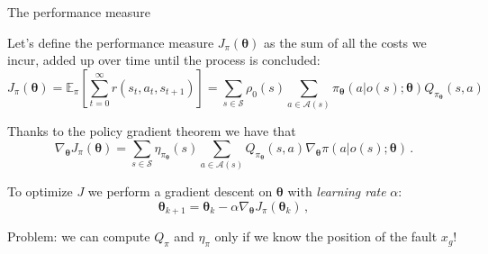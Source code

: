 \documentclass[10pt, aspectratio=169, compress, protectframetitle, handout]{beamer}
\begin{document}
\begin{frame}{The performance measure}
    
    Let's define the \alert{performance measure} $J_\pi(\boldsymbol \theta)$ as the sum of all the costs we incur, added up over time until the process is concluded:
    \begin{equation*}
            J_\pi (\boldsymbol \theta)
            = \mathbb E_\pi \left[ \sum_{t=0}^\infty r(s_t, a_t, s_{t+1}) \right]
            = \sum_{s \in \mathcal S} \rho_0(s) \sum_{a \in \mathcal A(s)} \pi_{\boldsymbol \theta} (a|o(s); \boldsymbol \theta) Q_{\pi_{\boldsymbol \theta}} (s,a)
    \end{equation*}
    
    Thanks to the \alert{policy gradient theorem} we have that
    \begin{equation*}
        \nabla_{\boldsymbol \theta} J_\pi (\boldsymbol \theta) = \sum_{s \in \mathcal S} \eta_{\pi_{\boldsymbol \theta}}(s) \sum_{a \in \mathcal A(s)} Q_{\pi_{\boldsymbol \theta}}(s,a) \nabla_{\boldsymbol \theta} \pi(a|o(s); \boldsymbol \theta) \, .
    \end{equation*}
    
    To optimize $J$ we perform a gradient descent on $\boldsymbol \theta$ with \emph{learning rate} $\alpha$:
    \begin{equation*}
        \boldsymbol \theta_{k+1} = \boldsymbol \theta_k - \alpha \nabla_{\boldsymbol \theta} J_\pi(\boldsymbol \theta_k) \, ,
    \end{equation*}
    
    
\end{frame}

\begin{frame}[standout]
    
    \alert{Problem:} we can compute $Q_\pi$ and $\eta_\pi$ only if we know the position of the fault $x_g$!
    
\end{frame}
\end{document}
